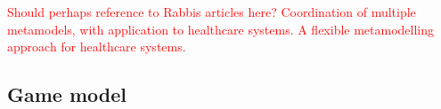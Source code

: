 \textcolor{red}{Should perhaps reference to Rabbis articles here? 
	Coordination	of multiple metamodels, with application	to healthcare systems.
A flexible metamodelling approach for healthcare systems. }


\subsection{Game model}